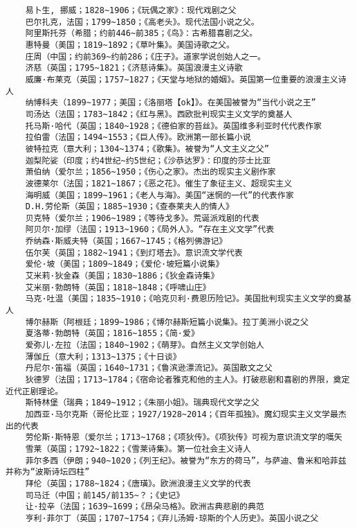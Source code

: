 \documentclass[UTF8]{../RepresentationUniverse}
\begin{document}
\begin{lstlisting}
    易卜生, 挪威；1828~1906；《玩偶之家》：现代戏剧之父
    巴尔扎克，法国；1799~1850；《高老头》。现代法国小说之父。
    阿里斯托芬（希腊；约前446~前385；《鸟》：古希腊喜剧之父。
    惠特曼（美国；1819~1892；《草叶集》。美国诗歌之父。
    庄周（中国；约前369~约前286；《庄子》。道家学说创始人之一。
    济慈（英国；1795~1821；《济慈诗集》。英国浪漫主义诗歌
    威廉·布莱克（英国；1757~1827；《天堂与地狱的婚姻》。英国第一位重要的浪漫主义诗人
    纳博科夫（1899~1977；美国；《洛丽塔【ok】》。在美国被誉为“当代小说之王”
    司汤达（法国；1783~1842；《红与黑》。西欧批判现实主义文学的奠基人
    托马斯·哈代（英国；1840~1928；《德伯家的苔丝》。英国维多利亚时代代表作家
    拉伯雷（法国；1494~1553；《巨人传》。欧洲第一部长篇小说
    彼特拉克（意大利；1304~1374；《歌集》。被誉为“人文主义之父”
    迦梨陀娑（印度；约4世纪~约5世纪；《沙恭达罗》：印度的莎士比亚
    萧伯纳（爱尔兰；1856~1950；《伤心之家》。杰出的现实主义剧作家
    波德莱尔（法国；1821~1867；《恶之花》。催生了象征主义、超现实主义
    海明威（美国；1899~1961；《老人与海》。美国“迷惘的一代”的代表作家
    D.H.劳伦斯（英国；1885~1930；《查泰莱夫人的情人》
    贝克特（爱尔兰；1906~1989；《等待戈多》。荒诞派戏剧的代表
    阿贝尔·加缪（法国；1913~1960；《局外人》。“存在主义文学”代表
    乔纳森·斯威夫特（英国；1667~1745；《格列佛游记》
    伍尔芙（英国；1882~1941；《到灯塔去》。意识流文学代表
    爱伦·坡（美国；1809~1849；《爱伦·坡短篇小说集》
    艾米莉·狄金森（美国；1830~1886；《狄金森诗集》
    艾米丽·勃朗特（英国；1818~1848；《呼啸山庄》
    马克·吐温（美国；1835~1910；《哈克贝利·费恩历险记》。美国批判现实主义文学的奠基人
    博尔赫斯（阿根廷；1899~1986；《博尔赫斯短篇小说集》。拉丁美洲小说之父
    夏洛蒂·勃朗特（英国；1816~1855；《简·爱》
    爱弥儿·左拉（法国；1840~1902；《萌芽》。自然主义文学创始人
    薄伽丘（意大利；1313~1375；《十日谈》
    丹尼尔·笛福（英国；1640~1731；《鲁滨逊漂流记》。英国散文之父
    狄德罗（法国；1713~1784；《宿命论者雅克和他的主人》。打破悲剧和喜剧的界限，奠定近代正剧理论。
    斯特林堡（瑞典；1849~1912；《朱丽小姐》。瑞典现代文学之父
    加西亚·马尔克斯（哥伦比亚；1927/1928~2014；《百年孤独》。魔幻现实主义文学最杰出的代表
    劳伦斯·斯特恩（爱尔兰；1713~1768；《项狄传》。《项狄传》可视为意识流文学的嚆矢
    雪莱（英国；1792~1822；《雪莱诗集》。第一位社会主义诗人
    菲尔多西（伊朗；940~1020；《列王纪》。被誉为“东方的荷马”，与萨迪、鲁米和哈菲兹并称为“波斯诗坛四柱”
    拜伦（英国；1788~1824；《唐璜》。欧洲浪漫主义文学的代表
    司马迁（中国；前145/前135~？；《史记》
    让·拉辛（法国；1639~1699；《昂朵马格》。欧洲古典悲剧的典范
    亨利·菲尔丁（英国；1707~1754；《弃儿汤姆·琼斯的个人历史》。英国小说之父

\end{lstlisting}
\end{document}
